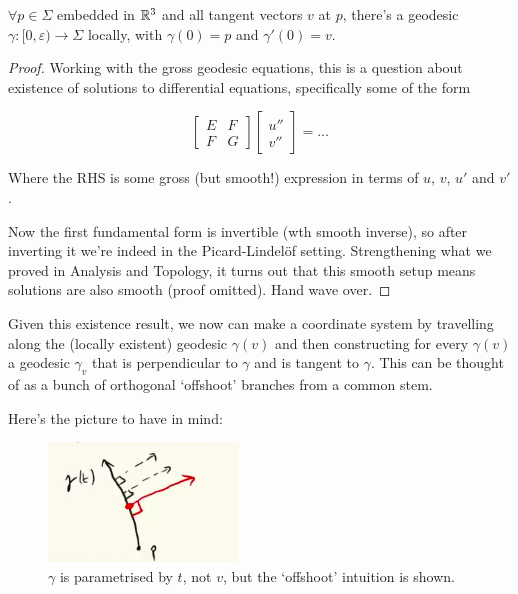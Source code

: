 \documentclass[11pt]{scrartcl}
\begin{document}
\begin{proposition}

$\forall p \in \Sigma$ embedded in $\mathbb R^3$ and all tangent vectors $v$ at $p$, there's a geodesic $\gamma : [0, \varepsilon) \rightarrow \Sigma$ locally, with $\gamma(0) = p$ and $\gamma'(0) = v$.

\begin{proof}
Working with the gross geodesic equations, this is a question about existence of solutions to differential equations, specifically some of the form

\begin{equation}
\begin{bmatrix}
E & F \\
F & G
\end{bmatrix}
\begin{bmatrix}
u'' \\
v''
\end{bmatrix}
=
...
\end{equation}

Where the RHS is some gross (but smooth!) expression in terms of $u$, $v$, $u'$ and $v'$.

Now the first fundamental form is invertible (wth smooth inverse), so after inverting it we're indeed in the Picard-Lindel{\"o}f setting. Strengthening what we proved in Analysis and Topology, it turns out that this smooth setup means solutions are also smooth (proof omitted). Hand wave over.
\end{proof}
\end{proposition}

Given this existence result, we now can make a coordinate system by travelling along the (locally existent) geodesic $\gamma(v)$ and then constructing for every $\gamma(v)$ a geodesic $\gamma_v$ that is perpendicular to $\gamma$ and is tangent to $\gamma$. This can be thought of as a bunch of orthogonal `offshoot' branches from a common stem.

Here's the picture to have in mind:

\begin{figure}[h]
\centering
\includegraphics[scale=0.5]{Selection_253.png}
\caption{$\gamma$ is parametrised by $t$, not $v$, but the `offshoot' intuition is shown.}
\label{fig:offshoot}
\end{figure}
\end{document}
